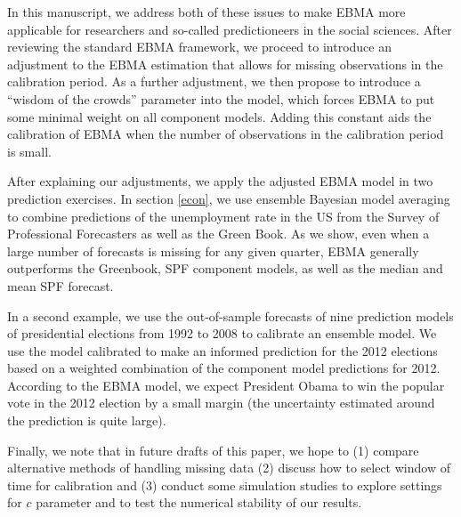 \documentclass[12pt,fullpage,endnotes]{article}
\begin{document}
In this manuscript, we address both of these issues to make
EBMA more applicable for researchers and so-called predictioneers in the social
sciences. After reviewing the standard EBMA framework, we proceed to
introduce an adjustment to the EBMA estimation that allows for missing
observations in the calibration period. As a further adjustment, we
then propose to introduce a ``wisdom of the crowds'' parameter into
the model, which forces EBMA to put some minimal weight on all
component models. Adding this constant aids the calibration of EBMA
when the number of observations in the calibration period is small.

After explaining our adjustments, we apply the adjusted EBMA model in
two prediction exercises. In section \ref{econ}, we use ensemble
Bayesian model averaging to combine predictions of the unemployment
rate in the US from the Survey of Professional Forecasters as well as
the Green Book. As we show, even when a large number of forecasts is
missing for any given quarter, EBMA generally outperforms the
Greenbook, SPF component models, as well as the median and mean SPF
forecast. 

In a second example, we use the out-of-sample forecasts of nine
prediction models of presidential elections from 1992 to 2008 to
calibrate an ensemble model. We use the model calibrated to make an
informed prediction for the 2012 elections based on a weighted
combination of the component model predictions for 2012. According to
the EBMA model, we expect President Obama to win the popular vote in
the 2012 election by a small margin (the uncertainty estimated around
the prediction is quite large).


Finally, we note that in future drafts of this paper, we hope to (1)
compare alternative methods of handling missing data (2) discuss how
to select window of time for calibration and (3) conduct some
simulation studies to explore settings for $c$ parameter and to test
the numerical stability of our results.
\end{document}
